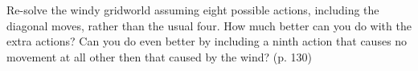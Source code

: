 
\begin{exercise}

Re-solve the windy gridworld assuming eight possible actions, including
the diagonal moves, rather than the usual four. How much better can you
do with the extra actions? Can you do even better by including a ninth
action that causes no movement at all other then that caused by the wind?
(p. 130)

\end{exercise}


\begin{solution}

\phantom{}

\end{solution}

